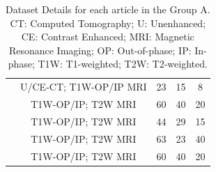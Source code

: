 \documentclass{article}
\begin{document}
\begin{table}[]
\begin{tabular}{ccccc}
        \cite{Ho2019}                       & U/CE-CT; T1W-OP/IP MRI                   & 23                                                 & 15                & 8              \\
        \cite{Liu2021}                      & T1W-OP/IP; T2W MRI                       & 60                                                 & 40                & 20             \\
        \cite{Schieda2017}                  & T1W-OP/IP; T2W MRI                       & 44                                                 & 29                & 15             \\
        \cite{Tu2020}                       & T1W-OP/IP; T2W MRI                       & 63                                                 & 23                & 40             \\
        \cite{Romeo2018}                    & T1W-OP/IP; T2W MRI                       & 60                                                 & 40                & 20
        \\\bottomrule
    \end{tabular}
    \caption{Dataset Details for each article in the Group A. CT: Computed Tomography; U: Unenhanced; CE: Contrast Enhanced; MRI: Magnetic Resonance Imaging; OP: Out-of-phase; IP: In-phase; T1W: T1-weighted; T2W: T2-weighted.}
    \label{tab:data_A}
\end{table}
\end{document}
